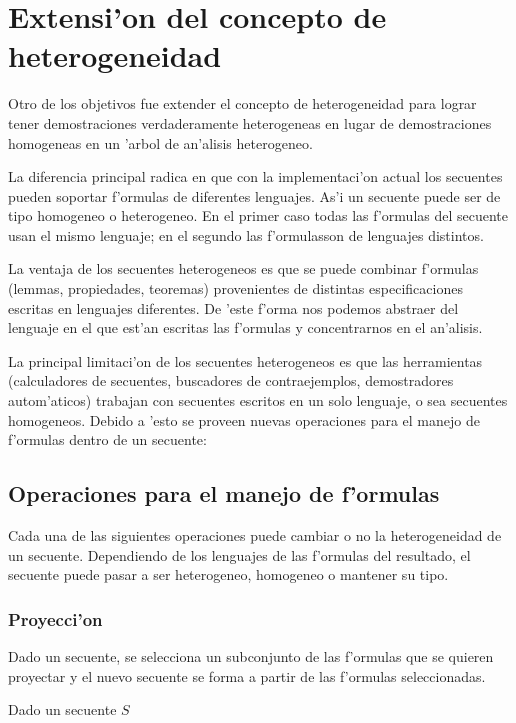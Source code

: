\section{Extensi'on del concepto de heterogeneidad}

Otro de los objetivos fue extender el concepto de heterogeneidad para lograr tener demostraciones verdaderamente heterogeneas en lugar de demostraciones homogeneas en un 'arbol de an'alisis heterogeneo. 

La diferencia principal radica en que con la implementaci'on actual los secuentes pueden soportar f'ormulas de diferentes lenguajes. As'i un secuente puede ser de tipo homogeneo o heterogeneo. En el primer caso todas las f'ormulas del secuente usan el mismo lenguaje; en el segundo las f'ormulasson de lenguajes distintos.

La ventaja de los secuentes heterogeneos es que se puede combinar f'ormulas (lemmas, propiedades, teoremas) provenientes de distintas especificaciones escritas en lenguajes diferentes. De 'este f'orma nos podemos abstraer del lenguaje en el que est'an escritas las f'ormulas y concentrarnos en el an'alisis.

La principal limitaci'on de los secuentes heterogeneos es que las herramientas (calculadores de secuentes, buscadores de contraejemplos, demostradores autom'aticos) trabajan con secuentes escritos en un solo lenguaje, o sea secuentes homogeneos. Debido a 'esto se proveen nuevas operaciones para el manejo de f'ormulas dentro de un secuente:

\subsection{Operaciones para el manejo de f'ormulas}

Cada una de las siguientes operaciones puede cambiar o no la heterogeneidad de un secuente.  Dependiendo de los lenguajes de las f'ormulas del resultado, el secuente puede pasar a ser heterogeneo, homogeneo o mantener su tipo.

\subsubsection{Proyecci'on}

Dado un secuente, se selecciona un subconjunto de las f'ormulas que se quieren proyectar y el nuevo secuente se forma a partir de las f'ormulas seleccionadas.

Dado un secuente $S$

